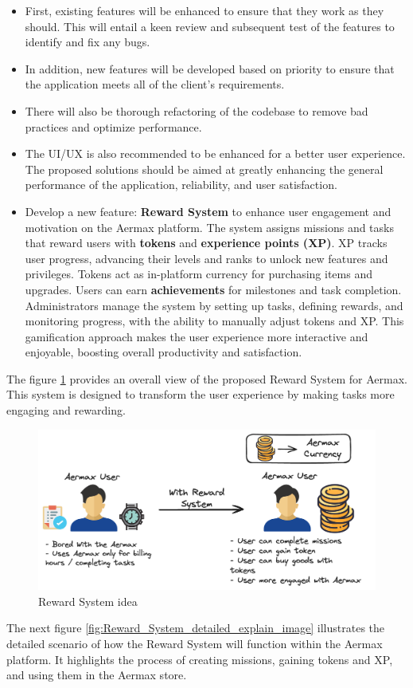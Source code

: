 \begin{itemize}
    \item First, existing features will be enhanced to ensure that they work as they should. This will entail a keen review and subsequent test of the features to identify and fix any bugs.
    \item In addition, new features will be developed based on priority to ensure that the application meets all of the client's requirements.
    \item There will also be thorough refactoring of the codebase to remove bad practices and optimize performance.
    \item The UI/UX is also recommended to be enhanced for a better user experience. The proposed solutions should be aimed at greatly enhancing the general performance of the application, reliability, and user satisfaction.
    \item Develop a new feature: \textbf{Reward System} to enhance user engagement and motivation on the Aermax platform. The system assigns missions and tasks that reward users with \textbf{tokens} and \textbf{experience points (XP)}. XP tracks user progress, advancing their levels and ranks to unlock new features and privileges. Tokens act as in-platform currency for purchasing items and upgrades. Users can earn \textbf{achievements} for milestones and task completion. Administrators manage the system by setting up tasks, defining rewards, and monitoring progress, with the ability to manually adjust tokens and XP. This gamification approach makes the user experience more interactive and enjoyable, boosting overall productivity and satisfaction.
\end{itemize}
The figure \ref{fig:Reward_System_explain_image} provides an overall view of the proposed Reward System for Aermax. This system is designed to transform the user experience by making tasks more engaging and rewarding.

\begin{figure}[H]
    \centering
    \includegraphics[width=1\textwidth]{src/assets/diagrams/rewardexplain.png}
    \caption{Reward System idea}
    \label{fig:Reward_System_explain_image}
\end{figure}
The next figure \ref{fig:Reward_System_detailed_explain_image} illustrates the detailed scenario of how the Reward System will function within the Aermax platform. It highlights the process of creating missions, gaining tokens and XP, and using them in the Aermax store.

